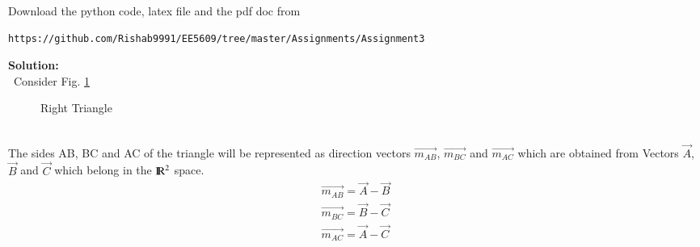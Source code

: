 \documentclass[journal,12pt,twocolumn]{IEEEtran}
\begin{document}
%
Download the python code, latex file and the pdf doc from 
\begin{lstlisting}
https://github.com/Rishab9991/EE5609/tree/master/Assignments/Assignment3
\end{lstlisting}
\textbf{Solution:}
\\\ Consider Fig. \ref{Fig:0}
\begin{figure}[!ht]
    \centering
     \caption{Right Triangle}
     \label{Fig:0}
\end{figure}
\\
The sides AB, BC and AC of the triangle will be represented as direction vectors $\vec{m_{AB}}$, $\vec{m_{BC}}$ and $\vec{m_{AC}}$ which are obtained from Vectors $\vec{A}$, $\vec{B}$ and $\vec{C}$ which belong in the ${\rm I\!R}^2$ space.\\
\begin{align}
   \vec{m_{AB}} = \vec{A} - \vec{B}\\ 
   \vec{m_{BC}} = \vec{B} - \vec{C}\\
   \vec{m_{AC}} = \vec{A} - \vec{C}
\end{align}\\
\end{document}
